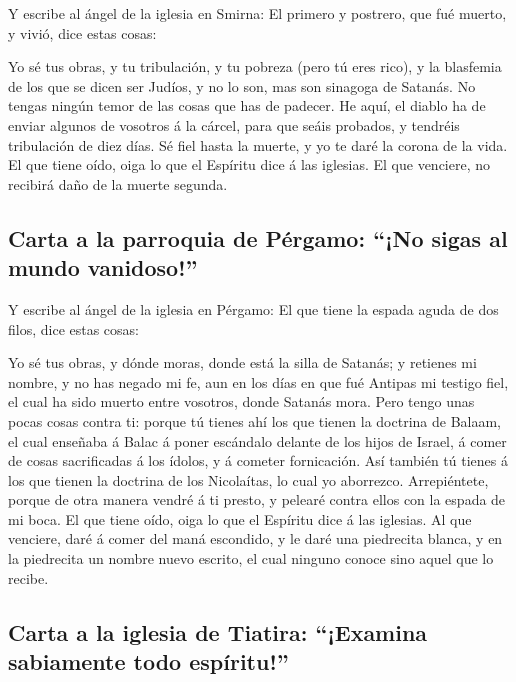  Y escribe al ángel de la iglesia en Smirna: El primero y
postrero, que fué muerto, y vivió, dice estas cosas:

 Yo sé tus obras, y tu tribulación, y tu pobreza (pero tú
eres rico), y la blasfemia de los que se dicen ser Judíos, y no lo son,
mas son sinagoga de Satanás.  No tengas ningún temor de las
cosas que has de padecer. He aquí, el diablo ha de enviar algunos de
vosotros á la cárcel, para que seáis probados, y tendréis tribulación de
diez días. Sé fiel hasta la muerte, y yo te daré la corona de la vida.
 El que tiene oído, oiga lo que el Espíritu dice á las
iglesias. El que venciere, no recibirá daño de la muerte segunda.

\hypertarget{carta-a-la-parroquia-de-puxe9rgamo-no-sigas-al-mundo-vanidoso}{%
\subsection{Carta a la parroquia de Pérgamo: ``¡No sigas al mundo
vanidoso!''}\label{carta-a-la-parroquia-de-puxe9rgamo-no-sigas-al-mundo-vanidoso}}

 Y escribe al ángel de la iglesia en Pérgamo: El que tiene
la espada aguda de dos filos, dice estas cosas:

 Yo sé tus obras, y dónde moras, donde está la silla de
Satanás; y retienes mi nombre, y no has negado mi fe, aun en los días en
que fué Antipas mi testigo fiel, el cual ha sido muerto entre vosotros,
donde Satanás mora.  Pero tengo unas pocas cosas contra ti:
porque tú tienes ahí los que tienen la doctrina de Balaam, el cual
enseñaba á Balac á poner escándalo delante de los hijos de Israel, á
comer de cosas sacrificadas á los ídolos, y á cometer fornicación.
 Así también tú tienes á los que tienen la doctrina de los
Nicolaítas, lo cual yo aborrezco.  Arrepiéntete, porque de
otra manera vendré á ti presto, y pelearé contra ellos con la espada de
mi boca.  El que tiene oído, oiga lo que el Espíritu dice á
las iglesias. Al que venciere, daré á comer del maná escondido, y le
daré una piedrecita blanca, y en la piedrecita un nombre nuevo escrito,
el cual ninguno conoce sino aquel que lo recibe.

\hypertarget{carta-a-la-iglesia-de-tiatira-examina-sabiamente-todo-espuxedritu}{%
\subsection{Carta a la iglesia de Tiatira: ``¡Examina sabiamente todo
espíritu!''}\label{carta-a-la-iglesia-de-tiatira-examina-sabiamente-todo-espuxedritu}}

